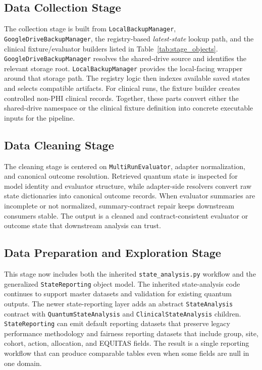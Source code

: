 \documentclass{IEEEtran}
\begin{document}
\subsection{Data Collection Stage}
The collection stage is built from \texttt{LocalBackupManager}, \texttt{GoogleDriveBackupManager}, the registry-based \textit{latest-state} lookup path, and the clinical fixture/evaluator builders listed in Table~\ref{tab:stage_objects}. \texttt{GoogleDriveBackupManager} resolves the shared-drive source and identifies the relevant storage root. \texttt{LocalBackupManager} provides the local-facing wrapper around that storage path. The registry logic then indexes available saved states and selects compatible artifacts. For clinical runs, the fixture builder creates controlled non-PHI clinical records. Together, these parts convert either the shared-drive namespace or the clinical fixture definition into concrete executable inputs for the pipeline.

\subsection{Data Cleaning Stage}
The cleaning stage is centered on \texttt{MultiRunEvaluator}, adapter normalization, and canonical outcome resolution. Retrieved quantum state is inspected for model identity and evaluator structure, while adapter-side resolvers convert raw state dictionaries into canonical outcome records. When evaluator summaries are incomplete or not normalized, summary-contract repair keeps downstream consumers stable. The output is a cleaned and contract-consistent evaluator or outcome state that downstream analysis can trust.

\subsection{Data Preparation and Exploration Stage}
This stage now includes both the inherited \texttt{state\_analysis.py} workflow and the generalized \texttt{StateReporting} object model. The inherited state-analysis code continues to support master datasets and validation for existing quantum outputs. The newer state-reporting layer adds an abstract \texttt{StateAnalysis} contract with \texttt{QuantumStateAnalysis} and \texttt{ClinicalStateAnalysis} children. \texttt{StateReporting} can emit default reporting datasets that preserve legacy performance methodology and fairness reporting datasets that include group, site, cohort, action, allocation, and EQUITAS fields. The result is a single reporting workflow that can produce comparable tables even when some fields are null in one domain.
\end{document}
